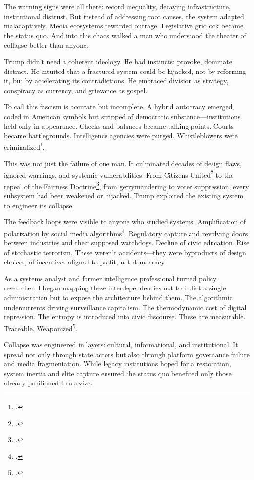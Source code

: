 \documentclass[12pt,openany]{book}
\begin{document}
The warning signs were all there: record inequality, decaying infrastructure, institutional distrust. But instead of addressing root causes, the system adapted maladaptively. Media ecosystems rewarded outrage. Legislative gridlock became the status quo. And into this chaos walked a man who understood the theater of collapse better than anyone.

Trump didn't need a coherent ideology. He had instincts: provoke, dominate, distract. He intuited that a fractured system could be hijacked, not by reforming it, but by accelerating its contradictions. He embraced division as strategy, conspiracy as currency, and grievance as gospel.

To call this fascism is accurate but incomplete. A hybrid autocracy emerged, coded in American symbols but stripped of democratic substance—institutions held only in appearance. Checks and balances became talking points. Courts became battlegrounds. Intelligence agencies were purged. Whistleblowers were criminalized\footcite{gellman2020dark}.

This was not just the failure of one man. It culminated decades of design flaws, ignored warnings, and systemic vulnerabilities. From Citizens United\footcite{citizensunitedvfec2010} to the repeal of the Fairness Doctrine\footcite{pickard2019fight}, from gerrymandering to voter suppression, every subsystem had been weakened or hijacked. Trump exploited the existing system to engineer its collapse.

The feedback loops were visible to anyone who studied systems. Amplification of polarization by social media algorithms\footcite{tufekci2015algorithmic}. Regulatory capture and revolving doors between industries and their supposed watchdogs. Decline of civic education. Rise of stochastic terrorism. These weren’t accidents—they were byproducts of design choices, of incentives aligned to profit, not democracy.

As a systems analyst and former intelligence professional turned policy researcher, I began mapping these interdependencies not to indict a single administration but to expose the architecture behind them. The algorithmic undercurrents driving surveillance capitalism. The thermodynamic cost of digital repression. The entropy is introduced into civic discourse. These are measurable. Traceable. Weaponized\footcite{zuboff2019age}.

Collapse was engineered in layers: cultural, informational, and institutional. It spread not only through state actors but also through platform governance failure and media fragmentation. While legacy institutions hoped for a restoration, system inertia and elite capture ensured the status quo benefited only those already positioned to survive.
\end{document}
